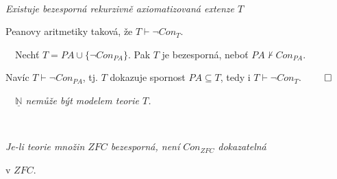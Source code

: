     
    \ \ {\it Existuje bezesporná rekurzivně axiomatizovaná extenze $T$
    \smallskip
    
    Peanovy aritmetiky taková, že $T\vdash \neg Con_T$.}
    \medskip
    
    \smallskip
    
    \ \ Nechť $T=PA \cup \{\neg Con_{PA}\}$. Pak $T$ je bezesporná, neboť $PA \not \vdash Con_{PA}$.
    \smallskip
    
    Navíc $T \vdash \neg Con_{PA}$, tj. $T$ dokazuje spornost $PA\subseteq T$, tedy i $T\vdash \neg Con_T$. $\qed$
    
    \medskip
    {\it {}\ \ $\underline{\mathbb{N}}$ nemůže být modelem teorie $T$.}
    
    \bigskip
    
    \ \ {\it Je-li teorie množin $ZFC$ bezesporná, není $Con_{ZFC}$ dokazatelná
    \smallskip
    
    v $ZFC$.}
    



